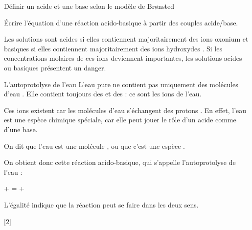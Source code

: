 \tetePremStssChim
{}

\begin{objectifs}
  \item Définir un acide et une base selon le modèle de Br\o{}nsted
  \item Écrire l'équation d'une réaction acido-basique à partir des couples acide/base.
\end{objectifs}

\begin{contexte}
  Les solutions sont acides si elles contiennent majoritairement des ions oxonium \oxonium
  et basiques si elles contiennent majoritairement des ions hydroxydes \hydroxyde.
  Si les concentrations molaires de ces ions deviennent importantes, les solutions acides ou basiques présentent un danger.

\end{contexte}

\begin{doc}{L'autoprotolyse de l'eau}
  L'eau pure ne contient pas uniquement des molécules d'eau \eau.
  Elle contient toujours des  \oxonium et des  \hydroxyde : ce sont les ions de l'eau.

  Ces ions existent car les molécules d'eau \eau s'échangent des protons \ionHydrogene.
  En effet, l'eau est une espèce chimique spéciale, car elle peut jouer le rôle d'un acide comme d'une base.
  \begin{importants}  
    On dit que l'eau est une molécule , ou que c'est une espèce .
  \end{importants}

  On obtient donc cette réaction acido-basique, qui s’appelle l’autoprotolyse de l’eau : 
  \begin{center}
    \eau +  = \oxonium + \hydroxyde
  \end{center}
  \attention L'égalité indique que la réaction peut se faire dans les deux sens.
\end{doc}


[2]


